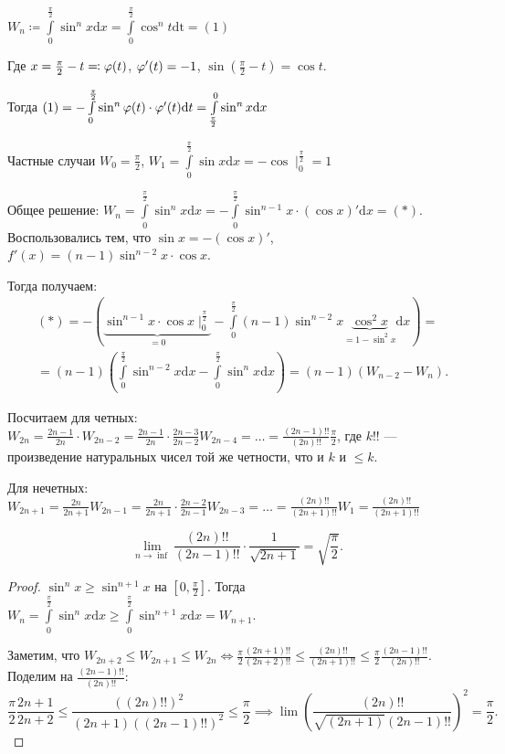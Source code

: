 \begin{example}
    $W_n \coloneqq \int\limits_0^{\frac{\pi}{2}} \sin^n x \mathrm{d}x = \int\limits_0^{\frac{\pi}{2}}\cos^n t \mathrm{dt} = (1)$

    Где $x = \frac{\pi}{2} - t \eqqcolon \varphi(t)$, $\varphi'(t) = -1$,  $\sin(\frac{\pi}{2} - t) = \cos t$. 

    Тогда $(1) = -\int\limits_0^{\frac{\pi}{2}}\sin^n \varphi(t) \cdot \varphi'(t) \mathrm{d}t = \int\limits_{\frac{\pi}{2}}^0 \sin^n x \mathrm{d}x$

    Частные случаи $W_0 = \frac{\pi}{2}$, $W_1 = \int\limits_0^{\frac{\pi}{2}} \sin x \mathrm{d}x = -\cos \mid_0^{\frac{\pi}{2}} = 1$

    Общее решение: $W_n = \int\limits_0^{\frac{\pi}{2}} \sin^n x \mathrm{d}x = -\int\limits_0^{\frac{\pi}{2}} \sin^{n-1}x \cdot (\cos x)' \mathrm{d}x = (*)$. Воспользовались тем, что $\sin x = -(\cos x)'$, $f'(x) = (n-1)\sin^{n-2} x \cdot \cos x$. 

    Тогда получаем: \begin{align*} &(*) = -\left(\underbrace{\sin^{n-1} x \cdot \cos x \mid_0^{\frac{\pi}{2}}}_{=0} - \int\limits_0^{\frac{\pi}{2}} (n-1)\sin^{n-2} x \underbrace{\cos^2 x}_{=1-\sin^2 x} \mathrm{d} x\right) = \\ & =(n-1)\left(\int\limits_{0}^{\frac{\pi}{2}} \sin^{n-2} x \mathrm{d}x - \int\limits_{0}^{\frac{\pi}{2}} \sin^n x \mathrm{d} x\right) = (n-1)(W_{n-2} - W_n).
    \end{align*}

    Посчитаем для четных: $W_{2n} = \frac{2n-1}{2n} \cdot W_{2n-2} = \frac{2n-1}{2n} \cdot \frac{2n-3}{2n - 2} W_{2n-4} = \ldots = \frac{(2n-1)!!}{(2n)!!} \frac{\pi}{2}$, где $k!!$  --- произведение натуральных чисел той же четности, что и  $k$ и  $\le k$.

    Для нечетных: $W_{2n + 1} = \frac{2n}{2n+1} W_{2n-1} = \frac{2n}{2n+1} \cdot \frac{2n-2}{2n-1}W_{2n-3} = \ldots = \frac{(2n)!!}{(2n+1)!!}W_1 = \frac{(2n)!!}{(2n+1)!!}$
\end{example}
\begin{theorem}
    \[
        \lim_{n\to \inf} \frac{(2n)!!}{(2n-1)!!} \cdot \frac{1}{\sqrt{2n+1}} = \sqrt{\frac{\pi}{2}}
    .\] 
\end{theorem}
\begin{proof}
    $\sin^n x \ge \sin^{n+1} x$ на $[0, \frac{\pi}{2}]$. Тогда $W_n = \int\limits_0^{\frac{\pi}{2}} \sin^n x \mathrm{d}x \ge \int\limits_0^{\frac{\pi}{2}} \sin^{n+1} x \mathrm{d}x = W_{n+1}$.

    Заметим, что $W_{2n+2} \le W_{2n+1} \le W_{2n} \iff \frac{\pi}{2}\frac{(2n+1)!!}{(2n+2)!!} \le \frac{(2n)!!}{(2n+1)!!} \le \frac{\pi}{2} \frac{(2n-1)!!}{(2n)!!}$. Поделим на $\frac{(2n-1)!!}{(2n)!!}$:  \[
        \frac{\pi}{2} \frac{2n+1}{2n+2} \le \frac{((2n)!!)^2}{(2n+1)((2n-1)!!)^2} \le \frac{\pi}{2} \implies \lim \left(\frac{(2n)!!}{\sqrt{(2n+1)}(2n-1)!!}\right)^2 = \frac{\pi}{2}
    .\] 
\end{proof}
